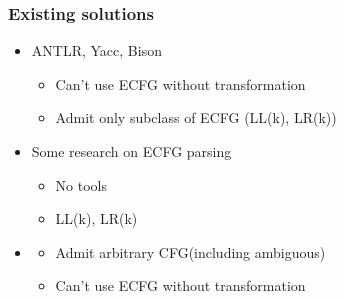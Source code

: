 \documentclass{beamer}
\begin{document}
	

	\begin{frame} 
		\frametitle{Existing solutions} 
		\begin{itemize}
			\item<1-> ANTLR, Yacc, Bison
			 \begin{itemize}
			 	\item<2-> Can't use ECFG without transformation
			 	\item<2-> Admit only subclass of ECFG (LL(k), LR(k))
			 \end{itemize} 
			\item<3-> Some research on ECFG parsing
			\begin{itemize}
				\item<4-> No tools
				\item<4-> LL(k), LR(k)
			\end{itemize}
			\item<5-> 
			\begin{itemize}
				\item<6-> Admit arbitrary CFG(including ambiguous)
				\item<6-> Can't use ECFG without transformation
			\end{itemize}
		\end{itemize}

	\end{frame}
\end{document}
